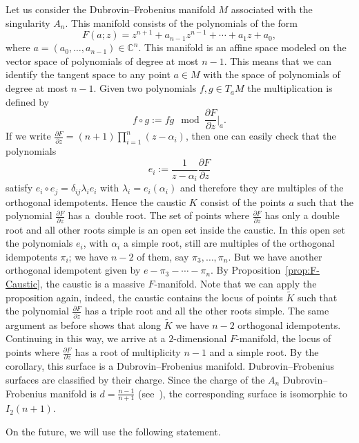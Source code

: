\documentclass[pdftex]{sigma}
\numberwithin{equation}{section}
\begin{document}
\begin{Example}
 Let us consider the Dubrovin--Frobenius manifold $M$ associated with the singularity $A_{n}$. This manifold consists of the polynomials of the form
 \begin{equation*}
 F(a;z)=z^{n+1}+a_{n-1}z^{n-1}+\cdots + a_{1}z + a_{0},
 \end{equation*}
 where $a=(a_{0},\dots,a_{n-1})\in\mathbb{C}^{n}$. This manifold is an affine space modeled on the vector space of polynomials of degree at most $n-1$. This means that we can identify the tangent space to any point $a\in M$ with the space of polynomials of degree at most $n-1$. Given two polynomials $f,g\in T_{a}M$ the multiplication is defined by
 \begin{equation*}
 f\circ g:= fg \mod \frac{\partial F}{\partial z}\bigg|_{a}.
 \end{equation*}
 If we write $\frac{\partial F}{\partial z}=(n+1)\prod_{i=1}^{n}(z-\alpha_{i})$, then one can easily check that the polynomials
 \begin{equation*}
 e_{i}:=\frac{1}{z-\alpha_{i}}\frac{\partial F}{\partial z}
 \end{equation*}
satisfy $e_{i}\circ e_{j}=\delta_{ij}\lambda_{i}e_{i}$ with $\lambda_{i}=e_{i}(\alpha_{i})$ and therefore they are multiples of the orthogonal idempotents. Hence the caustic $K$ consist of the points $a$ such that the polynomial $\frac{\partial F}{\partial z}$ has a~double root. The set of points where $\frac{\partial F}{\partial z}$ has only a double root and all other roots simple is an open set inside the caustic. In this open set the polynomials $e_{i}$, with $\alpha_{i}$ a simple root, still are multiples of the orthogonal idempotents $\pi_{i}$; we have $n-2$ of them, say $\pi_{3},\dots,\pi_{n}$. But we have another orthogonal idempotent given by $e-\pi_{3}-\cdots-\pi_{n}$. By Proposition~\ref{prop:F-Caustic}, the caustic is a massive $F$-manifold. Note that we can apply the proposition again, indeed, the caustic contains the locus of points $\tilde{K}$ such that the polynomial $\tfrac{\partial F}{\partial z}$ has a triple root and all the other roots simple. The same argument as before shows that along $\tilde{K}$ we have $n-2$ orthogonal idempotents. Continuing in this way, we arrive at a $2$-dimensional $F$-manifold, the locus of points where $\tfrac{\partial F}{\partial z}$ has a root of multiplicity $n-1$ and a simple root. By the corollary, this surface is a Dubrovin--Frobenius manifold. Dubrovin--Frobenius surfaces are classified by their charge. Since the charge of the $A_{n}$ Dubrovin--Frobenius manifold is $d=\frac{n-1}{n+1}$ (see~\cite{Dubrovin:1993nt}), the corresponding surface is isomorphic to $I_{2}(n+1)$.
\end{Example}
On the future, we will use the following statement.
\end{document}
